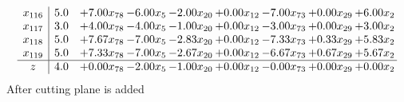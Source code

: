 \documentclass[8pt]{article}
\begin{document}
\[\begin{array}{c| c c@{\hskip 2pt} c@{\hskip 2pt} c@{\hskip 2pt} c@{\hskip 2pt} c@{\hskip 2pt} c@{\hskip 2pt} c@{\hskip 2pt} }
 x_{116}   &  5.0 & +  7.00 x_{78} & -6.00 x_{5} & -2.00 x_{20} & +  0.00 x_{12} & -7.00 x_{73} & +  0.00 x_{29} & +  6.00 x_{2}\\
 x_{117}   &  3.0 & +  4.00 x_{78} & -4.00 x_{5} & -1.00 x_{20} & +  0.00 x_{12} & -3.00 x_{73} & +  0.00 x_{29} & +  3.00 x_{2}\\
 x_{118}   &  5.0 & +  7.67 x_{78} & -7.00 x_{5} & -2.83 x_{20} & +  0.00 x_{12} & -7.33 x_{73} & +  0.33 x_{29} & +  5.83 x_{2}\\
 x_{119}   &  5.0 & +  7.33 x_{78} & -7.00 x_{5} & -2.67 x_{20} & +  0.00 x_{12} & -6.67 x_{73} & +  0.67 x_{29} & +  5.67 x_{2}\\
\hline
z    &  4.0 & +  0.00 x_{78} & -2.00 x_{5} & -1.00 x_{20} & +  0.00 x_{12} & -0.00 x_{73} & +  0.00 x_{29} & +  0.00 x_{2}\\
\end{array}\]
 After cutting plane is added 
\end{document}
